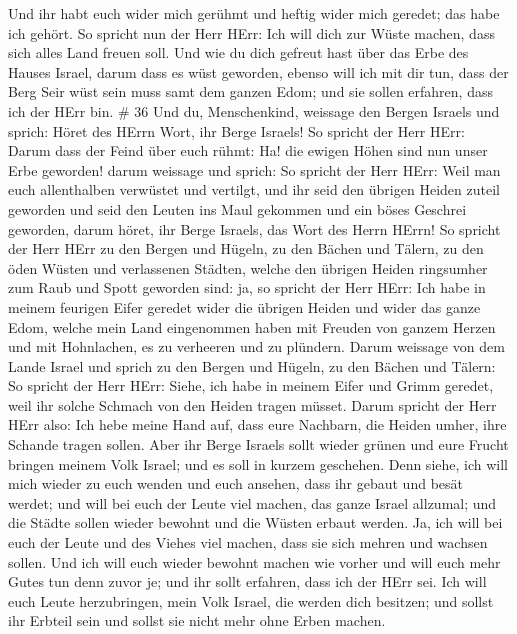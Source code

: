  Und ihr habt euch wider mich gerühmt und heftig wider mich
geredet; das habe ich gehört.  So spricht nun der Herr
HErr: Ich will dich zur Wüste machen, dass sich alles Land freuen soll.
 Und wie du dich gefreut hast über das Erbe des Hauses
Israel, darum dass es wüst geworden, ebenso will ich mit dir tun, dass
der Berg Seir wüst sein muss samt dem ganzen Edom; und sie sollen
erfahren, dass ich der HErr bin. \# 36  Und du,
Menschenkind, weissage den Bergen Israels und sprich: Höret des HErrn
Wort, ihr Berge Israels!  So spricht der Herr HErr: Darum
dass der Feind über euch rühmt: Ha! die ewigen Höhen sind nun unser Erbe
geworden!  darum weissage und sprich: So spricht der Herr
HErr: Weil man euch allenthalben verwüstet und vertilgt, und ihr seid
den übrigen Heiden zuteil geworden und seid den Leuten ins Maul gekommen
und ein böses Geschrei geworden,  darum höret, ihr Berge
Israels, das Wort des Herrn HErrn! So spricht der Herr HErr zu den
Bergen und Hügeln, zu den Bächen und Tälern, zu den öden Wüsten und
verlassenen Städten, welche den übrigen Heiden ringsumher zum Raub und
Spott geworden sind:  ja, so spricht der Herr HErr: Ich habe
in meinem feurigen Eifer geredet wider die übrigen Heiden und wider das
ganze Edom, welche mein Land eingenommen haben mit Freuden von ganzem
Herzen und mit Hohnlachen, es zu verheeren und zu plündern. 
Darum weissage von dem Lande Israel und sprich zu den Bergen und Hügeln,
zu den Bächen und Tälern: So spricht der Herr HErr: Siehe, ich habe in
meinem Eifer und Grimm geredet, weil ihr solche Schmach von den Heiden
tragen müsset.  Darum spricht der Herr HErr also: Ich hebe
meine Hand auf, dass eure Nachbarn, die Heiden umher, ihre Schande
tragen sollen.  Aber ihr Berge Israels sollt wieder grünen
und eure Frucht bringen meinem Volk Israel; und es soll in kurzem
geschehen.  Denn siehe, ich will mich wieder zu euch wenden
und euch ansehen, dass ihr gebaut und besät werdet;  und
will bei euch der Leute viel machen, das ganze Israel allzumal; und die
Städte sollen wieder bewohnt und die Wüsten erbaut werden. 
Ja, ich will bei euch der Leute und des Viehes viel machen, dass sie
sich mehren und wachsen sollen. Und ich will euch wieder bewohnt machen
wie vorher und will euch mehr Gutes tun denn zuvor je; und ihr sollt
erfahren, dass ich der HErr sei.  Ich will euch Leute
herzubringen, mein Volk Israel, die werden dich besitzen; und sollst ihr
Erbteil sein und sollst sie nicht mehr ohne Erben machen. 
